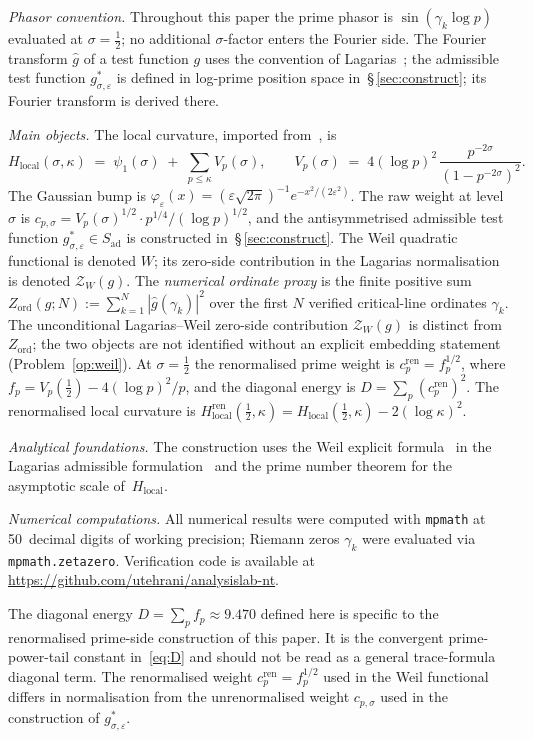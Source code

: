 \documentclass[11pt]{article}
\newcommand{\Hlocal}{H_{\mathrm{local}}}
\newcommand{\Hren}{H_{\mathrm{local}}^{\mathrm{ren}}}
\newcommand{\Sad}{S_{\mathrm{ad}}}
\newcommand{\cren}{c_p^{\mathrm{ren}}}
\begin{document}
\medskip
\emph{Phasor convention.}
Throughout this paper the prime phasor is
$\sin(\gamma_k \log p)$ evaluated at $\sigma = \tfrac12$;
no additional $\sigma$-factor enters the Fourier side.
The Fourier transform $\widehat g$ of a test function $g$
uses the convention of Lagarias~\cite{Lagarias};
the admissible test function $g^*_{\sigma,\varepsilon}$ is
defined in log-prime position space
in~\S\,\ref{sec:construct}; its Fourier transform is derived
there.

\medskip
\emph{Main objects.}
The local curvature, imported from~\cite{Paper1}, is
\[
\Hlocal(\sigma,\kappa) \;=\; \psi_1(\sigma)
\;+\; \sum_{p\le\kappa} V_p(\sigma),
\qquad
V_p(\sigma) \;=\; 4(\log p)^2\,
\frac{p^{-2\sigma}}{(1-p^{-2\sigma})^2}.
\]
The Gaussian bump is $\varphi_\varepsilon(x)=
(\varepsilon\sqrt{2\pi})^{-1} e^{-x^2/(2\varepsilon^2)}$.
The raw weight at level $\sigma$ is
$c_{p,\sigma} = V_p(\sigma)^{1/2}\cdot p^{1/4}/(\log p)^{1/2}$,
and the antisymmetrised admissible test function
$g^*_{\sigma,\varepsilon}\in\Sad$ is constructed
in~\S\,\ref{sec:construct}.
The Weil quadratic functional is denoted $W$;
its zero-side contribution in the Lagarias
normalisation~\cite{Lagarias} is denoted $\mathcal{Z}_W(g)$.
The \emph{numerical ordinate proxy} is the finite positive sum
$Z_{\mathrm{ord}}(g;N) := \sum_{k=1}^{N}
|\widehat g(\gamma_k)|^2$
over the first $N$ verified critical-line ordinates $\gamma_k$.
The unconditional Lagarias--Weil zero-side contribution
$\mathcal{Z}_W(g)$ is distinct from $Z_{\mathrm{ord}}$;
the two objects are not identified without an explicit
embedding statement (Problem~\ref{op:weil}).
At $\sigma=\tfrac12$ the renormalised prime weight is
$\cren = f_p^{1/2}$, where
$f_p = V_p(\tfrac12)-4(\log p)^2/p$, and the diagonal
energy is $D=\sum_p (\cren)^2$.
The renormalised local curvature is
$\Hren(\tfrac12,\kappa)=\Hlocal(\tfrac12,\kappa)-2(\log\kappa)^2$.

\medskip
\emph{Analytical foundations.}
The construction uses the Weil explicit formula~\cite{Weil} in the
Lagarias admissible formulation~\cite{Lagarias} and the
prime number theorem for the asymptotic scale of~$\Hlocal$.

\medskip
\emph{Numerical computations.}
All numerical results were computed with \texttt{mpmath}
at 50~decimal digits of working precision;
Riemann zeros $\gamma_k$ were evaluated via
\texttt{mpmath.zetazero}.
Verification code is available at
\url{https://github.com/utehrani/analysislab-nt}.

\medskip
The diagonal energy $D = \sum_p f_p \approx 9.470$ defined here is
specific to the renormalised prime-side construction of this paper.
It is the convergent prime-power-tail constant in~\eqref{eq:D} and
should not be read as a general trace-formula diagonal term.
The renormalised weight $\cren=f_p^{1/2}$ used in the Weil
functional differs in normalisation from the unrenormalised
weight $c_{p,\sigma}$ used in the construction of
$g^*_{\sigma,\varepsilon}$.
\end{document}
